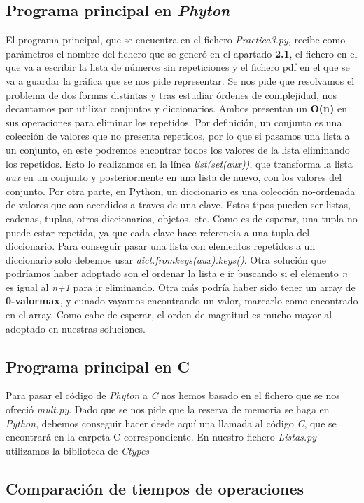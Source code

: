 \documentclass{article}
\begin{document}
\subsection{Programa principal en \textit{Phyton}}
El programa principal, que se encuentra en el fichero \textit{Practica3.py}, recibe como parámetros el nombre del fichero que se generó en el apartado \textbf{2.1}, el fichero en el que va a escribir la lista de números sin repeticiones y el fichero pdf en el que se va a guardar la gráfica que se nos pide representar.
\newline
Se nos pide que resolvamos el problema de dos formas distintas y tras estudiar órdenes de complejidad, nos decantamos por utilizar conjuntos y diccionarios. Ambos presentan un \textbf{O(n)} en sus operaciones para eliminar los repetidos. Por definición, un conjunto es una colección de valores que no presenta repetidos, por lo que si pasamos una lista a un conjunto, en este podremos encontrar todos los valores de la lista eliminando los repetidos. Esto lo realizamos en la línea \textit{list(set(aux))}, que transforma la lista \textit{aux} en un conjunto y posteriormente en una lista de nuevo, con los valores del conjunto. 
\newline
Por otra parte, en Python, un diccionario es una colección no-ordenada de valores que son accedidos a traves de una clave. Estos tipos pueden ser listas, cadenas, tuplas, otros diccionarios, objetos, etc. Como es de esperar, una tupla no puede estar repetida, ya que cada clave hace referencia a una tupla del diccionario. Para conseguir pasar una lista con elementos repetidos a un diccionario solo debemos usar \textit{dict.fromkeys(aux).keys()}.
\newline \newline
Otra solución que podríamos haber adoptado son el ordenar la lista e ir buscando si el elemento \textit{n} es igual al \textit{n+1} para ir eliminando. Otra más podría haber sido tener un array de \textbf{0-valormax}, y cunado vayamos encontrando un valor, marcarlo como encontrado en el array.
\newline
Como cabe de esperar, el orden de magnitud es mucho mayor al adoptado en nuestras soluciones.
\subsection{Programa principal en C}
Para pasar el código de \textit{Phyton} a \textit{C} nos hemos basado en el fichero que se nos ofreció \textit{mult.py}.
\newline
Dado que se nos pide que la reserva de memoria se haga en \textit{Python}, debemos conseguir hacer desde aquí una llamada al código \textit{C}, que se encontrará en la carpeta C correspondiente.
\newline
En nuestro fichero \textit{Listas.py} utilizamos la biblioteca de \textit{Ctypes}
\subsection{Comparación de tiempos de operaciones}


\end{document}
